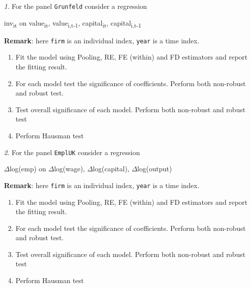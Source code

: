 \documentclass[12pt]{article}
\theoremstyle{remark}
\newtheorem{exercise}{}[section]
\begin{document}
\begin{exercise}
For the panel \texttt{Grunfeld} consider a regression
\begin{center}
	inv\textsubscript{it} on value\textsubscript{it}, value\textsubscript{i,t-1}, 
	capital\textsubscript{it}, capital\textsubscript{i,t-1}
\end{center}
\textbf{Remark}: here \texttt{firm} is an individual index, 
\texttt{year} is a time index.
\begin{enumerate}
	\item Fit the model using Pooling, RE, FE (within) and FD estimators
	and report the fitting result.
	\item For each model test the significance of coefficients. Perform both
	non-robust and robust test.
	\item Test overall significance of each model. Perform both
	non-robust and robust test
	\item Perform Hausman test
\end{enumerate}
\end{exercise}

\begin{exercise}
For the panel \texttt{EmplUK} consider a regression
\begin{center}
	\(\Delta\)log(emp) on \(\Delta\)log(wage), \(\Delta\)log(capital), \(\Delta\)log(output) 
\end{center}
\textbf{Remark}: here \texttt{firm} is an individual index, 
\texttt{year} is a time index.
\begin{enumerate}
	\item Fit the model using Pooling, RE, FE (within) and FD estimators
	and report the fitting result.
	\item For each model test the significance of coefficients. Perform both
	non-robust and robust test.
	\item Test overall significance of each model. Perform both
	non-robust and robust test
	\item Perform Hausman test
\end{enumerate}
\end{exercise}
\end{document}
